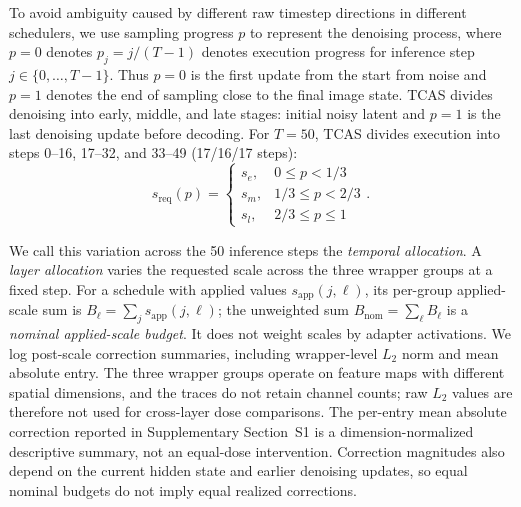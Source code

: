 \documentclass[times,twocolumn,final]{elsarticle}
\providecommand{\DIFadd}[1]{{\protect\color{blue} \sf #1}} %
\providecommand{\DIFdel}[1]{{\protect\color{red} \scriptsize #1}} %
\providecommand{\DIFaddbegin}{} %
\providecommand{\DIFaddend}{} %
\providecommand{\DIFdelbegin}{} %
\providecommand{\DIFdelend}{} %
\begin{document}
To avoid ambiguity caused by different raw timestep directions in different schedulers, \DIFdelbegin \DIFdel{we use sampling progress $p$ to represent the denoising process, where $p = 0$ denotes }\DIFdelend \DIFaddbegin \DIFadd{$p_j=j/(T-1)$ denotes execution progress for inference step $j\in\{0,\ldots,T-1\}$. Thus $p=0$ is the first update from }\DIFaddend the \DIFdelbegin \DIFdel{start from noise and $p = 1$ denotes the end of sampling close to the final image state. TCAS divides denoising into early, middle, and late stages:
}%
\DIFdelend \DIFaddbegin \DIFadd{initial noisy latent and $p=1$ is the last denoising update before decoding. For $T=50$, TCAS divides execution into steps 0--16, 17--32, and 33--49 (17/16/17 steps):
}\begin{equation}
s_{\mathrm{req}}(p) = \begin{cases} s_e, & 0 \leq p < 1/3 \\ s_m, & 1/3 \leq p < 2/3 \\ s_l, & 2/3 \leq p \leq 1 \end{cases}.
\label{eq:tcas}
\end{equation}\DIFaddend

\DIFaddbegin \DIFadd{We call this variation across the 50 inference steps the \emph{temporal allocation}. A \emph{layer allocation} varies the requested scale across the three wrapper groups at a fixed step. For a schedule with applied values $s_{\mathrm{app}}(j,\ell)$, its per-group applied-scale sum is $B_\ell=\sum_j s_{\mathrm{app}}(j,\ell)$; the unweighted sum $B_{\mathrm{nom}}=\sum_\ell B_\ell$ is a \emph{nominal applied-scale budget}. It does not weight scales by adapter activations. We log post-scale correction summaries, including wrapper-level $L_2$ norm and mean absolute entry. The three wrapper groups operate on feature maps with different spatial dimensions, and the traces do not retain channel counts; raw $L_2$ values are therefore not used for cross-layer dose comparisons. The per-entry mean absolute correction reported in Supplementary Section~S1 is a dimension-normalized descriptive summary, not an equal-dose intervention. Correction magnitudes also depend on the current hidden state and earlier denoising updates, so equal nominal budgets do not imply equal realized corrections.
}
\end{document}
